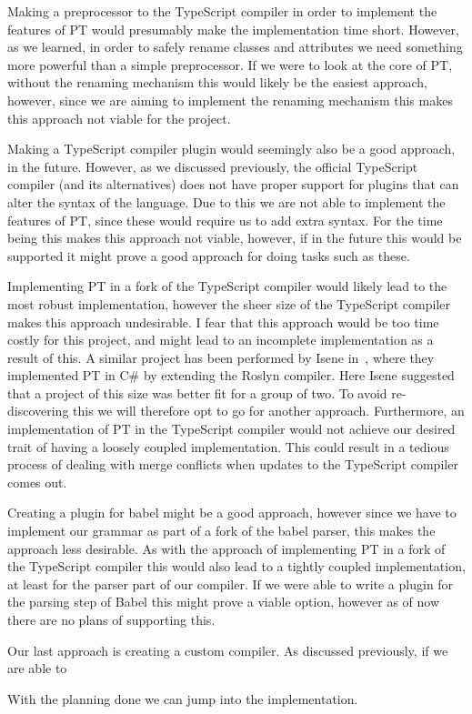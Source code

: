 Making a preprocessor to the TypeScript compiler in order to implement the features of PT would presumably make the implementation time short.
However, as we learned, in order to safely rename classes and attributes we need something more powerful than a simple preprocessor.
If we were to look at the core of PT, without the renaming mechanism this would likely be the easiest approach, however, since we are aiming to implement the renaming mechanism this makes this approach not viable for the project.

Making a TypeScript compiler plugin would seemingly also be a good approach, in the future.
However, as we discussed previously, the official TypeScript compiler (and its alternatives) does not have proper support for plugins that can alter the syntax of the language.
Due to this we are not able to implement the features of PT, since these would require us to add extra syntax.
For the time being this makes this approach not viable, however, if in the future this would be supported it might prove a good approach for doing tasks such as these.

Implementing PT in a fork of the TypeScript compiler would likely lead to the most robust implementation, however the sheer size of the TypeScript compiler makes this approach undesirable.
I fear that this approach would be too time costly for this project, and might lead to an incomplete implementation as a result of this.
A similar project has been performed by Isene in~\cite{Isene2018}, where they implemented PT in C\# by extending the Roslyn compiler.
Here Isene suggested that a project of this size was better fit for a group of two.
To avoid re-discovering this we will therefore opt to go for another approach.
Furthermore, an implementation of PT in the TypeScript compiler would not achieve our desired trait of having a loosely coupled implementation.
This could result in a tedious process of dealing with merge conflicts when updates to the TypeScript compiler comes out.

Creating a plugin for babel might be a good approach, however since we have to implement our grammar as part of a fork of the babel parser, this makes the approach less desirable.
As with the approach of implementing PT in a fork of the TypeScript compiler this would also lead to a tightly coupled implementation, at least for the parser part of our compiler.
If we were able to write a plugin for the parsing step of Babel this might prove a viable option, however as of now there are no plans of supporting this.

Our last approach is creating a custom compiler.
As discussed previously, if we are able to %

With the planning done we can jump into the implementation.